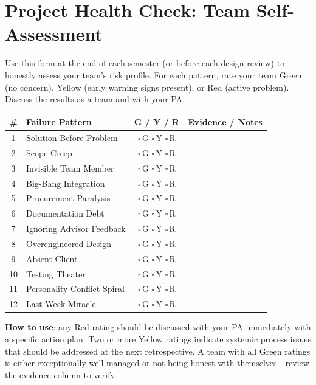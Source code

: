 \section*{Project Health Check: Team Self-Assessment}
Use this form at the end of each semester (or before each design review) to honestly assess your team's risk profile. For each pattern, rate your team Green (no concern), Yellow (early warning signs present), or Red (active problem). Discuss the results as a team and with your PA.

\begin{center}\small
\begin{longtable}{c p{3.8cm} c p{5.5cm}}
\toprule
\textbf{\#} & \textbf{Failure Pattern} & \textbf{G / Y / R} & \textbf{Evidence / Notes} \\
\midrule
\endhead
1 & Solution Before Problem & $\square$\,G $\square$\,Y $\square$\,R & \\[0.4cm]
2 & Scope Creep & $\square$\,G $\square$\,Y $\square$\,R & \\[0.4cm]
3 & Invisible Team Member & $\square$\,G $\square$\,Y $\square$\,R & \\[0.4cm]
4 & Big-Bang Integration & $\square$\,G $\square$\,Y $\square$\,R & \\[0.4cm]
5 & Procurement Paralysis & $\square$\,G $\square$\,Y $\square$\,R & \\[0.4cm]
6 & Documentation Debt & $\square$\,G $\square$\,Y $\square$\,R & \\[0.4cm]
7 & Ignoring Advisor Feedback & $\square$\,G $\square$\,Y $\square$\,R & \\[0.4cm]
8 & Overengineered Design & $\square$\,G $\square$\,Y $\square$\,R & \\[0.4cm]
9 & Absent Client & $\square$\,G $\square$\,Y $\square$\,R & \\[0.4cm]
10 & Testing Theater & $\square$\,G $\square$\,Y $\square$\,R & \\[0.4cm]
11 & Personality Conflict Spiral & $\square$\,G $\square$\,Y $\square$\,R & \\[0.4cm]
12 & Last-Week Miracle & $\square$\,G $\square$\,Y $\square$\,R & \\[0.4cm]
\bottomrule
\end{longtable}
\end{center}

\textbf{How to use}: any Red rating should be discussed with your PA immediately with a specific action plan. Two or more Yellow ratings indicate systemic process issues that should be addressed at the next retrospective. A team with all Green ratings is either exceptionally well-managed or not being honest with themselves---review the evidence column to verify.

